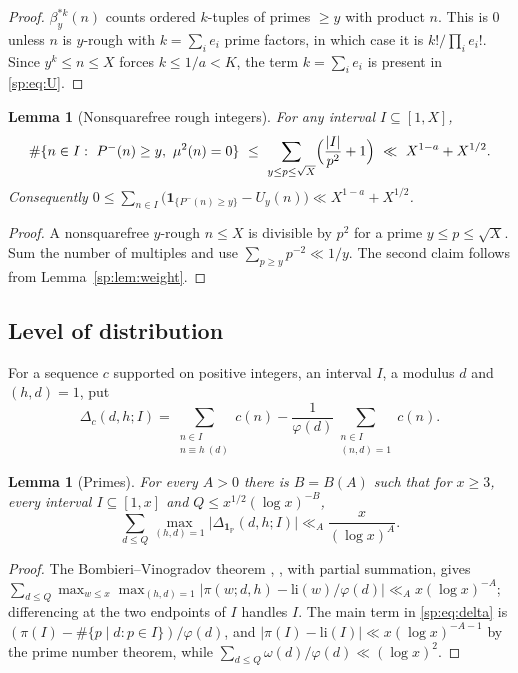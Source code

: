 \documentclass[final,11pt]{elsarticle}
\newtheorem{lemma}[theorem]{Lemma}
\theoremstyle{definition}
\theoremstyle{remark}
\newcommand{\PP}{\mathbb{P}}
\newcommand{\one}{\mathbf1}
\numberwithin{equation}{section}
\begin{document}
\begin{proof}
$\beta_y^{*k}(n)$ counts ordered $k$-tuples of primes $\ge y$ with product $n$.
This is $0$ unless $n$ is $y$-rough with $k=\sum_ie_i$ prime factors, in which
case it is $k!/\prod_ie_i!$. Since $y^k\le n\le X$ forces $k\le1/a<K$, the
term $k=\sum_ie_i$ is present in \eqref{sp:eq:U}.
\end{proof}

\begin{lemma}[Nonsquarefree rough integers]\label{sp:lem:squarefull}
For any interval $I\subseteq[1,X]$,
\[
 \#\{n\in I:\ P^-(n)\ge y,\ \mu^2(n)=0\}\ \le\ \sum_{y\le p\le\sqrt X}\Bigl(\frac{|I|}{p^2}+1\Bigr)
 \ \ll\ X^{1-a}+X^{1/2}.
\]
Consequently $0\le\sum_{n\in I}\bigl(\one_{\{P^-(n)\ge y\}}-U_y(n)\bigr)\ll X^{1-a}+X^{1/2}$.
\end{lemma}

\begin{proof}
A nonsquarefree $y$-rough $n\le X$ is divisible by $p^2$ for a prime
$y\le p\le\sqrt X$. Sum the number of multiples and use
$\sum_{p\ge y}p^{-2}\ll1/y$. The second claim follows from
Lemma~\ref{sp:lem:weight}.
\end{proof}

\subsection{Level of distribution}\label{sp:sec:distribution}

For a sequence $c$ supported on positive integers, an interval $I$, a modulus
$d$ and $(h,d)=1$, put
\begin{equation}\label{sp:eq:delta}
 \Delta_c(d,h;I)=\sum_{\substack{n\in I\\ n\equiv h\ (d)}}c(n)
 -\frac1{\varphi(d)}\sum_{\substack{n\in I\\ (n,d)=1}}c(n).
\end{equation}

\begin{lemma}[Primes]\label{sp:lem:BV}
For every $A>0$ there is $B=B(A)$ such that for $x\ge3$, every interval
$I\subseteq[1,x]$ and $Q\le x^{1/2}(\log x)^{-B}$,
\[
 \sum_{d\le Q}\max_{(h,d)=1}\bigl|\Delta_{\one_\PP}(d,h;I)\bigr|\ll_A\frac{x}{(\log x)^A}.
\]
\end{lemma}

\begin{proof}
The Bombieri--Vinogradov theorem
\cite{Bombieri65,Vinogradov65}, \cite[Ch.~28]{Davenport}, with partial
summation, gives
$\sum_{d\le Q}\max_{w\le x}\max_{(h,d)=1}|\pi(w;d,h)-\mathrm{li}(w)/\varphi(d)|\ll_A x(\log x)^{-A}$;
differencing at the two endpoints of $I$ handles $I$. The main term in
\eqref{sp:eq:delta} is $(\pi(I)-\#\{p\mid d:p\in I\})/\varphi(d)$, and
$|\pi(I)-\mathrm{li}(I)|\ll x(\log x)^{-A-1}$ by the prime number theorem, while
$\sum_{d\le Q}\omega(d)/\varphi(d)\ll(\log x)^2$.
\end{proof}
\end{document}
